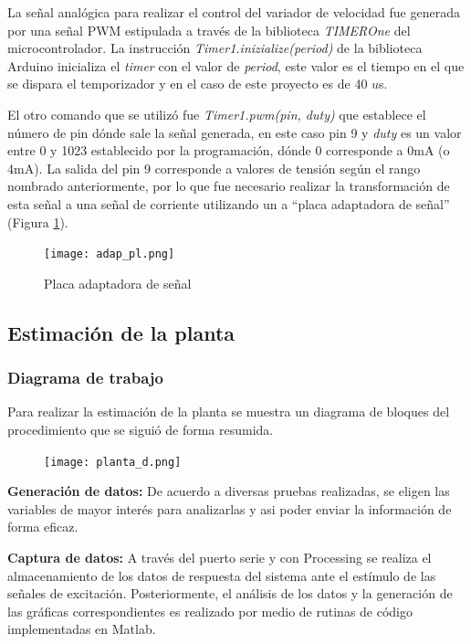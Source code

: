 La señal analógica para realizar el control del variador de velocidad fue generada por una señal PWM estipulada a través de la biblioteca \textit{TIMEROne} del microcontrolador. La instrucción \textit{Timer1.inizialize(period)} de la biblioteca Arduino inicializa el \textit{timer} con el valor de \textit{period}, este valor es el tiempo en el que se dispara el temporizador y en el caso de este proyecto es de 40 $u$s.

El otro comando que se utilizó fue \textit{Timer1.pwm(pin, duty)} que establece el número de
pin dónde sale la señal generada, en este caso pin 9 y \textit{duty} es un valor entre 0 y 1023 establecido por la programación, dónde 0 corresponde a 0mA (o 4mA). La salida del pin 9 corresponde a valores de tensión según el rango nombrado anteriormente, por lo que fue necesario realizar la transformación de esta señal a una señal de corriente utilizando un a “placa adaptadora de señal” (Figura \ref{fig:adapt}).

\begin{figure}[htbp]
	\centering
	\texttt{[image: adap\_pl.png]}
	\caption{Placa adaptadora de señal}
	\label{fig:adapt}
\end{figure}



\subsection{Estimación de la planta} \label{sec:estima}
    \subsubsection{Diagrama de trabajo}

Para realizar la estimación de la planta se muestra un diagrama de bloques del procedimiento que se siguió de forma resumida.

\begin{figure}[htb]
	\centering
	\texttt{[image: planta\_d.png]}
	\label{fig:planta_d}
\end{figure}

 \textbf{Generación de datos:} De acuerdo a diversas pruebas realizadas, se eligen las variables de mayor interés para analizarlas y asi poder enviar la información de forma eficaz.

 \textbf{Captura de datos:} A través del puerto serie y con Processing se realiza el almacenamiento de los datos de respuesta del sistema ante el estímulo de las señales de excitación. Posteriormente, el análisis de los datos y la generación de las gráficas correspondientes es realizado por medio de rutinas de código implementadas en Matlab.

